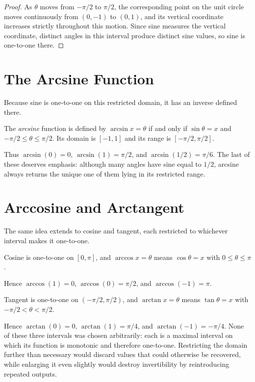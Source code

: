 \begin{proof}
As $\theta$ moves from $-\pi/2$ to $\pi/2$, the corresponding point on the
unit circle moves continuously from $(0,-1)$ to $(0,1)$, and its vertical
coordinate increases strictly throughout this motion. Since sine measures
the vertical coordinate, distinct angles in this interval produce distinct
sine values, so sine is one-to-one there.
\end{proof}

\section{The Arcsine Function}

Because sine is one-to-one on this restricted domain, it has an inverse
defined there.

\begin{definition}
The \emph{arcsine} function is defined by $\arcsin x = \theta$ if and only
if $\sin\theta = x$ and $-\pi/2 \le \theta \le \pi/2$. Its domain is
$[-1,1]$ and its range is $\left[-\pi/2, \pi/2\right]$.
\end{definition}

Thus $\arcsin(0) = 0$, $\arcsin(1) = \pi/2$, and $\arcsin(1/2) = \pi/6$.
The last of these deserves emphasis: although many angles have sine equal
to $1/2$, arcsine always returns the unique one of them lying in its
restricted range.

\section{Arccosine and Arctangent}

The same idea extends to cosine and tangent, each restricted to whichever
interval makes it one-to-one.

\begin{definition}
Cosine is one-to-one on $[0,\pi]$, and $\arccos x = \theta$ means
$\cos\theta = x$ with $0 \le \theta \le \pi$.
\end{definition}

Hence $\arccos(1) = 0$, $\arccos(0) = \pi/2$, and $\arccos(-1) = \pi$.

\begin{definition}
Tangent is one-to-one on $\left(-\pi/2, \pi/2\right)$, and $\arctan x =
\theta$ means $\tan\theta = x$ with $-\pi/2 < \theta < \pi/2$.
\end{definition}

Hence $\arctan(0) = 0$, $\arctan(1) = \pi/4$, and $\arctan(-1) = -\pi/4$.
None of these three intervals was chosen arbitrarily: each is a maximal
interval on which its function is monotonic and therefore one-to-one.
Restricting the domain further than necessary would discard values that
could otherwise be recovered, while enlarging it even slightly would
destroy invertibility by reintroducing repeated outputs.

